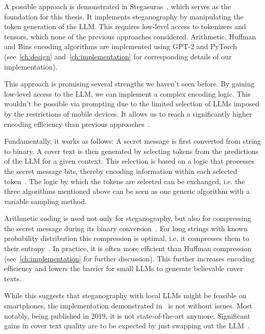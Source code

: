 A possible approach is demonstrated in Stegasuras~\cite{zieglerNeuralLinguisticSteganography2019,zieglerHarvardnlpNeuralSteganography2025,zieglerStegasuras2025}, which serves as the foundation for this thesis. It implements steganography by manipulating the token generation of the \gls{LLM}. This requires low-level access to tokenizers and tensors, which none of the previous approaches considered. Arithmetic, Huffman and Bins encoding algorithms are implemented using GPT-2 and PyTorch (see~\cref{ch:design} and~\cref{ch:implementation} for corresponding details of our implementation).

This approach is promising several strengths we haven't seen before. By gaining low-level access to the \gls{LLM}, we can implement a complex encoding logic. This wouldn't be possible via prompting due to the limited selection of \glspl{LLM} imposed by the restrictions of mobile devices. It allows us to reach a significantly higher encoding efficiency than previous approaches~\cite{zieglerNeuralLinguisticSteganography2019}.

Fundamentally, it works as follows: A secret message is first converted from string to binary. A cover text is then generated by selecting tokens from the predictions of the \gls{LLM} for a given context. This selection is based on a logic that processes the secret message bits, thereby encoding information within each selected token~\cite{zieglerNeuralLinguisticSteganography2019}. The logic by which the tokens are selected can be exchanged, i.e. the three algorithms mentioned above can be seen as one generic algorithm with a variable sampling method.

Arithmetic coding is used not only for steganography, but also for compressing the secret message during its binary conversion~\cite{zieglerNeuralLinguisticSteganography2019}. For long strings with known probability distribution this compression is optimal, i.e. it compresses them to their entropy~\cite{rissanenArithmeticCoding1979}. In practice, it is often more efficient than Huffman compression~\cite{zieglerNeuralLinguisticSteganography2019} (see~\cref{ch:implementation} for further discussion). This further increases encoding efficiency and lowers the barrier for small \glspl{LLM} to generate believable cover texts.

While this suggests that steganography with local \glspl{LLM} might be feasible on smartphones, the implementation demonstrated in~\cite{zieglerStegasuras2025} is not without issues. Most notably, being published in 2019, it is not state-of-the-art anymore. Significant gains in cover text quality are to be expected by just swapping out the \gls{LLM}~\cite{wuGenerativeTextSteganography2024}.

